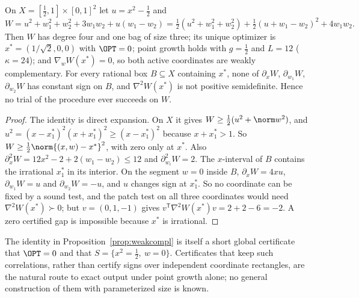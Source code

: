 \begin{proposition}\label{prop:weakcompl}
On $X=[\frac12,1]\times[0,1]^2$ let $u=x^2-\frac12$ and
\[
W=u^2+w_1^2+w_2^2+3w_1w_2+u(w_1-w_2)
=\tfrac12(u^2+w_1^2+w_2^2)+\tfrac12(u+w_1-w_2)^2+4w_1w_2 .
\]
Then $W$ has degree four and one bag of size three; its unique optimizer is
$x^*=(1/\sqrt2,0,0)$ with $\OPT=0$; point growth holds with $g=\frac12$ and
$L=12$ ($\kappa=24$); and $\nabla_wW(x^*)=0$, so both active coordinates are
weakly complementary. For every rational box $B\subseteq X$ containing $x^*$,
none of $\partial_xW$, $\partial_{w_1}W$, $\partial_{w_2}W$ has constant sign on
$B$, and $\nabla^2W(x^*)$ is not positive semidefinite. Hence no trial of the
procedure ever succeeds on $W$.
\end{proposition}

\begin{proof}
The identity is direct expansion. On $X$ it gives $W\ge\frac12(u^2+\norm w^2)$,
and $u^2=(x-x^*_1)^2(x+x^*_1)^2\ge(x-x^*_1)^2$ because $x+x^*_1>1$. So
$W\ge\frac12\norm{(x,w)-x^*}^2$, with zero only at $x^*$. Also
$\partial_x^2W=12x^2-2+2(w_1-w_2)\le12$ and $\partial_{w_i}^2W=2$. The
$x$-interval of $B$ contains the irrational $x^*_1$ in its interior. On the
segment $w=0$ inside $B$, $\partial_xW=4xu$, $\partial_{w_1}W=u$ and
$\partial_{w_2}W=-u$, and $u$ changes sign at $x^*_1$. So no coordinate can be
fixed by a sound test, and the patch test on all three coordinates would
need $\nabla^2W(x^*)\succ0$; but $v=(0,1,-1)$ gives
$v^{\mathsf T}\nabla^2W(x^*)v=2+2-6=-2$. A zero certified gap is impossible
because $x^*$ is irrational.
\end{proof}

The identity in Proposition~\ref{prop:weakcompl} is itself a short global
certificate that $\OPT=0$ and that $S=\{x^2=\frac12,\ w=0\}$. Certificates
that keep such correlations, rather than certify signs over independent
coordinate rectangles, are the natural route to exact output under point
growth alone; no general construction of them with parameterized size is
known.
